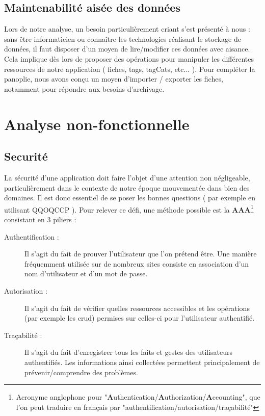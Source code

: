 \subsection*{Maintenabilité aisée des données}

Lors de notre analyse, un besoin particulièrement criant s'est présenté à nous : sans être informaticien ou connaître les technologies réalisant le stockage de données, il faut disposer d'un moyen de lire/modifier ces données avec aisance. \\

Cela implique dès lors de proposer des opérations pour manipuler les différentes ressources de notre application ( \glspl{fiche}, \glspl{tag}, \glspl{tagCat}, etc... ). Pour compléter la panoplie, nous avons conçu un moyen d'importer / exporter les \glspl{fiche}, notamment pour répondre aux besoins d'archivage.

\pagebreak


\section{Analyse non-fonctionnelle}

\subsection*{Securité}

La sécurité d'une application doit faire l'objet d'une attention non négligeable, particulièrement dans le contexte de notre époque mouvementée dans bien des domaines. Il est donc essentiel de se poser les bonnes questions ( par exemple en utilisant \Gls{QQOQCCP} ). Pour relever ce défi, une méthode possible est la \textbf{AAA}\footnote{Acronyme anglophone pour "\textbf{A}uthentication/\textbf{A}uthorization/\textbf{A}ccounting", que l'on peut traduire en français par "authentification/autorisation/traçabilité" }
consistant en 3 piliers : 

\begin{description}
    \item[Authentification :] Il s'agit du fait de prouver l'utilisateur que l'on prétend être. Une manière fréquemment utilisée sur de nombreux sites consiste en association d'un nom d'utilisateur et d'un mot de passe.
    \item[Autorisation :] Il s'agit du fait de vérifier quelles ressources accessibles et les opérations (par exemple les \Gls{crud}) permises sur celles-ci pour l'utilisateur authentifié.
    \item[Traçabilité :] Il s'agit du fait d'enregistrer tous les faits et gestes des utilisateurs authentifiés. Les informations ainsi collectées permettent principalement de prévenir/comprendre des problèmes. 
\end{description}


